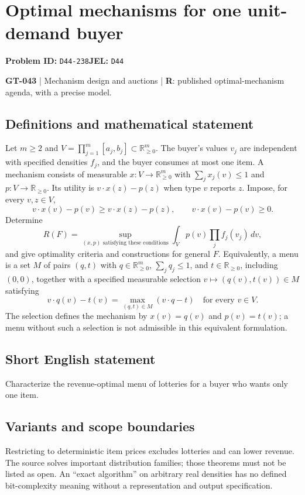 \documentclass[11pt,a4paper]{article}
\begin{document}
\section*{Optimal mechanisms for one unit-demand buyer}
\textbf{Problem ID:} \texttt{D44-238}\quad \textbf{JEL:} \texttt{D44}\par
\label{problem:OP-0173}
\label{game:GT-043}
{\sffamily\small\color{muted}
\textbf{GT-043} | Mechanism design and auctions | \textbf{R}: published optimal-mechanism agenda, with a precise model.
\par}
\subsection*{Definitions and mathematical statement}
Let $m\geq2$ and $V=\prod_{j=1}^m[a_j,b_j]\subset\mathbb R_{\geq0}^m$. The buyer's values $v_j$ are independent with specified densities $f_j$, and the buyer consumes at most one item. A mechanism consists of measurable $x:V\to\mathbb R_{\geq0}^m$ with $\sum_jx_j(v)\leq1$ and $p:V\to\mathbb R_{\geq0}$. Its utility is $v\cdot x(z)-p(z)$ when type $v$ reports $z$. Impose, for every $v,z\in V$,
\[
 v\cdot x(v)-p(v)\geq v\cdot x(z)-p(z),\qquad v\cdot x(v)-p(v)\geq0.
\]
Determine
\[
 R(F)=\sup_{(x,p)\text{ satisfying these conditions}}\int_Vp(v)\prod_jf_j(v_j)\,dv,
\]
and give optimality criteria and constructions for general $F$. Equivalently, a menu is a set $M$ of pairs $(q,t)$ with $q\in\mathbb R_{\geq0}^m$, $\sum_jq_j\leq1$, and $t\in\mathbb R_{\geq0}$, including $(0,0)$, together with a specified measurable selection $v\mapsto(q(v),t(v))\in M$ satisfying
\[
 v\cdot q(v)-t(v)=\max_{(q,t)\in M}(v\cdot q-t)
 \quad\text{for every }v\in V.
\]
The selection defines the mechanism by $x(v)=q(v)$ and $p(v)=t(v)$; a menu without such a selection is not admissible in this equivalent formulation.
\subsection*{Short English statement}
Characterize the revenue-optimal menu of lotteries for a buyer who wants only one item.
\subsection*{Variants and scope boundaries}
Restricting to deterministic item prices excludes lotteries and can lower revenue. The source solves important distribution families; those theorems must not be listed as open. An ``exact algorithm'' on arbitrary real densities has no defined bit-complexity meaning without a representation and output specification.
\end{document}
